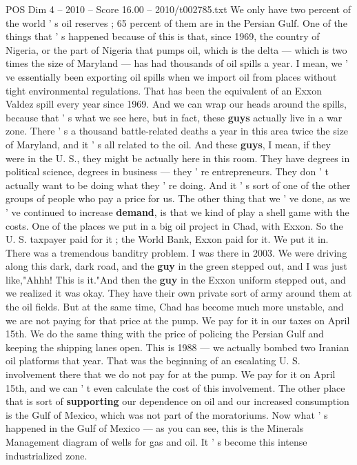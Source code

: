\begin{textsample}{POS Dim 4 – 2010 – Score 16.00 – 2010/t002785.txt}
We only have two percent of the world ' s oil reserves ; 65 percent of them are in the Persian Gulf.
One of the things that ' s happened because of this is that, since 1969, the country of Nigeria, or the part of Nigeria that pumps oil, which is the delta — which is two times the size of Maryland — has had thousands of oil spills a year.
I mean, we ' ve essentially been exporting oil spills when we import oil from places without tight environmental regulations.
That has been the equivalent of an Exxon Valdez spill every year since 1969.
And we can wrap our heads around the spills, because that ' s what we see here, but in fact, these \textbf{guys} actually live in a war zone.
There ' s a thousand battle-related deaths a year in this area twice the size of Maryland, and it ' s all related to the oil.
And these \textbf{guys}, I mean, if they were in the U.
S., they might be actually here in this room.
They have degrees in political science, degrees in business — they ' re entrepreneurs.
They don ' t actually want to be doing what they ' re doing.
And it ' s sort of one of the other groups of people who pay a price for us.
The other thing that we ' ve done, as we ' ve continued to increase \textbf{demand}, is that we kind of play a shell game with the costs.
One of the places we put in a big oil project in Chad, with Exxon.
So the U.
S. taxpayer paid for it ; the World Bank, Exxon paid for it.
We put it in.
There was a tremendous banditry problem.
I was there in 2003.
We were driving along this dark, dark road, and the \textbf{guy} in the green stepped out, and I was just like,"Ahhh!
This is it."And then the \textbf{guy} in the Exxon uniform stepped out, and we realized it was okay.
They have their own private sort of army around them at the oil fields.
But at the same time, Chad has become much more unstable, and we are not paying for that price at the pump.
We pay for it in our taxes on April 15th.
We do the same thing with the price of policing the Persian Gulf and keeping the shipping lanes open.
This is 1988 — we actually bombed two Iranian oil platforms that year.
That was the beginning of an escalating U.
S. involvement there that we do not pay for at the pump.
We pay for it on April 15th, and we can ' t even calculate the cost of this involvement.
The other place that is sort of \textbf{supporting} our dependence on oil and our increased consumption is the Gulf of Mexico, which was not part of the moratoriums.
Now what ' s happened in the Gulf of Mexico — as you can see, this is the Minerals Management diagram of wells for gas and oil.
It ' s become this intense industrialized zone.

\end{textsample}
